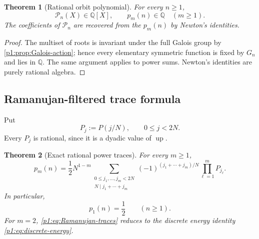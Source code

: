 \documentclass[11pt,oneside]{article}
\newtheorem{theorem}{Theorem}[section]
\theoremstyle{definition}
\theoremstyle{remark}
\newcommand{\Q}{\mathbb Q}
\newcommand{\Up}{\operatorname{up}}
\begin{document}
\begin{theorem}[Rational orbit polynomial]\label{p1:thm:rational-orbit-poly}
For every $n\ge1$,
\begin{equation}\label{p1:eq:orbit-poly-rational}
 \mathcal P_n(X)\in\Q[X],
 \qquad
 p_m(n)\in\Q\quad(m\ge1).
\end{equation}
The coefficients of $\mathcal P_n$ are recovered from the $p_m(n)$ by Newton's
identities.
\end{theorem}

\begin{proof}
The multiset of roots is invariant under the full Galois group by
\cref{p1:prop:Galois-action}; hence every elementary symmetric function is fixed
by $G_n$ and lies in $\Q$.  The same argument applies to power sums.  Newton's
identities are purely rational algebra.
\end{proof}

\subsection{Ramanujan-filtered trace formula}

Put
\begin{equation}\label{p1:eq:P-j-sample}
 P_j:=P(j/N),
 \qquad 0\le j<2N.
\end{equation}
Every $P_j$ is rational, since it is a dyadic value of $\Up$.

\begin{theorem}[Exact rational power traces]\label{p1:thm:Ramanujan-traces}
For every $m\ge1$,
\begin{equation}\label{p1:eq:Ramanujan-traces}
\boxed{
 p_m(n)=\frac12N^{1-m}
 \sum_{\substack{0\le j_1,\ldots,j_m<2N\\
                  N\mid j_1+\cdots+j_m}}
 (-1)^{(j_1+\cdots+j_m)/N}
 \prod_{\ell=1}^{m}P_{j_\ell}.}
\end{equation}
In particular,
\begin{equation}\label{p1:eq:universal-trace}
 \boxed{p_1(n)=\frac12\qquad(n\ge1).}
\end{equation}
For $m=2$, \eqref{p1:eq:Ramanujan-traces} reduces to the discrete energy identity
\eqref{p1:eq:discrete-energy}.
\end{theorem}
\end{document}
